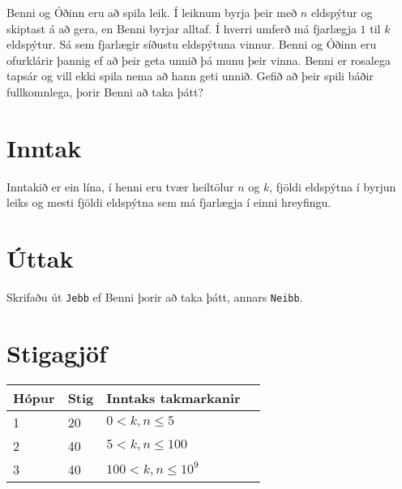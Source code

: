 Benni og Óðinn eru að spila leik. Í leiknum byrja þeir með $n$ eldspýtur og skiptast á að gera, en Benni byrjar alltaf. Í hverri umferð má fjarlægja $1$ til $k$ eldspýtur. Sá sem fjarlægir síðustu eldspýtuna vinnur. Benni og Óðinn eru ofurklárir þannig ef að þeir geta unnið þá munu þeir vinna. Benni er rosalega tapsár og vill ekki spila nema að hann geti unnið. Gefið að þeir spili báðir fullkomnlega, þorir Benni að taka þátt?

\section*{Inntak}
Inntakið er ein lína, í henni eru tvær heiltölur $n$ og $k$, fjöldi eldspýtna í byrjun leiks og mesti fjöldi eldspýtna sem má fjarlægja í einni hreyfingu.

\section*{Úttak}
Skrifaðu út \texttt{Jebb} ef Benni þorir að taka þátt, annars \texttt{Neibb}.

\section*{Stigagjöf}
\begin{tabular}{|l|l|l|l|}
\hline
Hópur & Stig & Inntaks takmarkanir \\ \hline
1     & 20     & $0 < k,n \leq 5$ \\ \hline
2     & 40     & $5 < k,n \leq 100$ \\ \hline
3     & 40     & $100 < k,n \leq 10^9$ \\ \hline
\end{tabular}
